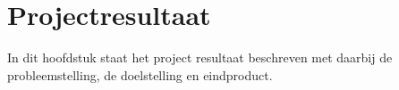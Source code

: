 \chapter{Projectresultaat}
In dit hoofdstuk staat het project resultaat beschreven met daarbij de probleemstelling, de doelstelling en eindproduct.



